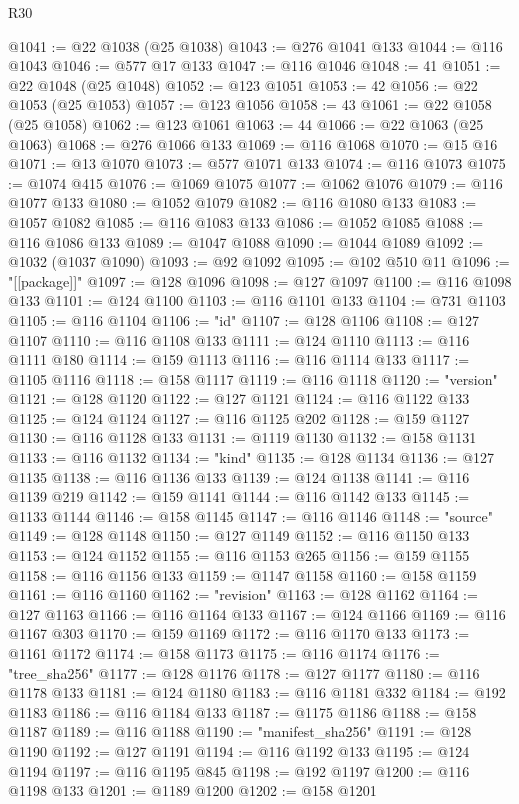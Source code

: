 \begin{lexlean}{R30}
\begin{coremodule}
@1041 := @22 @1038 (@25 @1038)
@1043 := @276 @1041 @133
@1044 := @116 @1043
@1046 := @577 @17 @133
@1047 := @116 @1046
@1048 := 41
@1051 := @22 @1048 (@25 @1048)
@1052 := @123 @1051
@1053 := 42
@1056 := @22 @1053 (@25 @1053)
@1057 := @123 @1056
@1058 := 43
@1061 := @22 @1058 (@25 @1058)
@1062 := @123 @1061
@1063 := 44
@1066 := @22 @1063 (@25 @1063)
@1068 := @276 @1066 @133
@1069 := @116 @1068
@1070 := @15 @16
@1071 := @13 @1070
@1073 := @577 @1071 @133
@1074 := @116 @1073
@1075 := @1074 @415
@1076 := @1069 @1075
@1077 := @1062 @1076
@1079 := @116 @1077 @133
@1080 := @1052 @1079
@1082 := @116 @1080 @133
@1083 := @1057 @1082
@1085 := @116 @1083 @133
@1086 := @1052 @1085
@1088 := @116 @1086 @133
@1089 := @1047 @1088
@1090 := @1044 @1089
@1092 := @1032 (@1037 @1090)
@1093 := @92 @1092
@1095 := @102 @510 @11
@1096 := "[[package]]"
@1097 := @128 @1096
@1098 := @127 @1097
@1100 := @116 @1098 @133
@1101 := @124 @1100
@1103 := @116 @1101 @133
@1104 := @731 @1103
@1105 := @116 @1104
@1106 := "id"
@1107 := @128 @1106
@1108 := @127 @1107
@1110 := @116 @1108 @133
@1111 := @124 @1110
@1113 := @116 @1111 @180
@1114 := @159 @1113
@1116 := @116 @1114 @133
@1117 := @1105 @1116
@1118 := @158 @1117
@1119 := @116 @1118
@1120 := "version"
@1121 := @128 @1120
@1122 := @127 @1121
@1124 := @116 @1122 @133
@1125 := @124 @1124
@1127 := @116 @1125 @202
@1128 := @159 @1127
@1130 := @116 @1128 @133
@1131 := @1119 @1130
@1132 := @158 @1131
@1133 := @116 @1132
@1134 := "kind"
@1135 := @128 @1134
@1136 := @127 @1135
@1138 := @116 @1136 @133
@1139 := @124 @1138
@1141 := @116 @1139 @219
@1142 := @159 @1141
@1144 := @116 @1142 @133
@1145 := @1133 @1144
@1146 := @158 @1145
@1147 := @116 @1146
@1148 := "source"
@1149 := @128 @1148
@1150 := @127 @1149
@1152 := @116 @1150 @133
@1153 := @124 @1152
@1155 := @116 @1153 @265
@1156 := @159 @1155
@1158 := @116 @1156 @133
@1159 := @1147 @1158
@1160 := @158 @1159
@1161 := @116 @1160
@1162 := "revision"
@1163 := @128 @1162
@1164 := @127 @1163
@1166 := @116 @1164 @133
@1167 := @124 @1166
@1169 := @116 @1167 @303
@1170 := @159 @1169
@1172 := @116 @1170 @133
@1173 := @1161 @1172
@1174 := @158 @1173
@1175 := @116 @1174
@1176 := "tree_sha256"
@1177 := @128 @1176
@1178 := @127 @1177
@1180 := @116 @1178 @133
@1181 := @124 @1180
@1183 := @116 @1181 @332
@1184 := @192 @1183
@1186 := @116 @1184 @133
@1187 := @1175 @1186
@1188 := @158 @1187
@1189 := @116 @1188
@1190 := "manifest_sha256"
@1191 := @128 @1190
@1192 := @127 @1191
@1194 := @116 @1192 @133
@1195 := @124 @1194
@1197 := @116 @1195 @845
@1198 := @192 @1197
@1200 := @116 @1198 @133
@1201 := @1189 @1200
@1202 := @158 @1201

\end{coremodule}
\end{lexlean}
